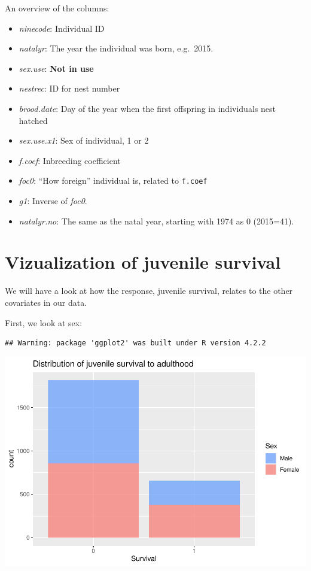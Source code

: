 An overview of the columns:

\begin{itemize}
\tightlist
\item
  \emph{ninecode}: Individual ID
\item
  \emph{natalyr}: The year the individual was born, e.g.~2015.
\item
  \emph{sex.use}: \textbf{Not in use}
\item
  \emph{nestrec}: ID for nest number
\item
  \emph{brood.date}: Day of the year when the first offspring in
  individuals nest hatched
\item
  \emph{sex.use.x1}: Sex of individual, 1 or 2
\item
  \emph{f.coef}: Inbreeding coefficient
\item
  \emph{foc0}: ``How foreign'' individual is, related to \texttt{f.coef}
\item
  \emph{g1}: Inverse of \emph{foc0}.
\item
  \emph{natalyr.no}: The same as the natal year, starting with 1974 as 0
  (2015=41).
\end{itemize}

\hypertarget{vizualization-of-juvenile-survival}{%
\section*{Vizualization of juvenile
survival}\label{vizualization-of-juvenile-survival}}

We will have a look at how the response, juvenile survival, relates to
the other covariates in our data.

First, we look at sex:

\begin{verbatim}
## Warning: package 'ggplot2' was built under R version 4.2.2
\end{verbatim}

\includegraphics{EDA_files/figure-latex/unnamed-chunk-7-1.pdf}

